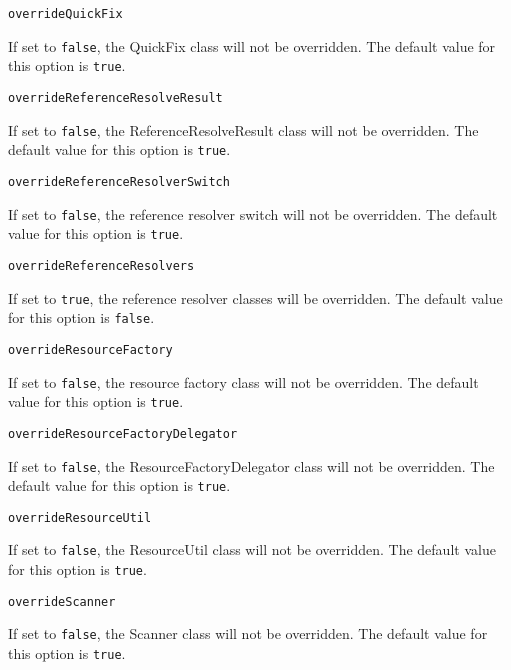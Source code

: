 \noindent\texttt{overrideQuickFix}
\begin{myindentpar}{1cm}
If set to \texttt{false}, the QuickFix class will not be overridden. The default value for this option is \texttt{true}.
\end{myindentpar}

\noindent\texttt{overrideReferenceResolveResult}
\begin{myindentpar}{1cm}
If set to \texttt{false}, the ReferenceResolveResult class will not be overridden. The default value for this option is \texttt{true}.
\end{myindentpar}

\noindent\texttt{overrideReferenceResolverSwitch}
\begin{myindentpar}{1cm}
If set to \texttt{false}, the reference resolver switch will not be overridden. The default value for this option is \texttt{true}.
\end{myindentpar}

\noindent\texttt{overrideReferenceResolvers}
\begin{myindentpar}{1cm}
If set to \texttt{true}, the reference resolver classes will be overridden. The default value for this option is \texttt{false}.
\end{myindentpar}

\noindent\texttt{overrideResourceFactory}
\begin{myindentpar}{1cm}
If set to \texttt{false}, the resource factory class will not be overridden. The default value for this option is \texttt{true}.
\end{myindentpar}

\noindent\texttt{overrideResourceFactoryDelegator}
\begin{myindentpar}{1cm}
If set to \texttt{false}, the ResourceFactoryDelegator class will not be overridden. The default value for this option is \texttt{true}.
\end{myindentpar}

\noindent\texttt{overrideResourceUtil}
\begin{myindentpar}{1cm}
If set to \texttt{false}, the ResourceUtil class will not be overridden. The default value for this option is \texttt{true}.
\end{myindentpar}

\noindent\texttt{overrideScanner}
\begin{myindentpar}{1cm}
If set to \texttt{false}, the Scanner class will not be overridden. The default value for this option is \texttt{true}.
\end{myindentpar}

